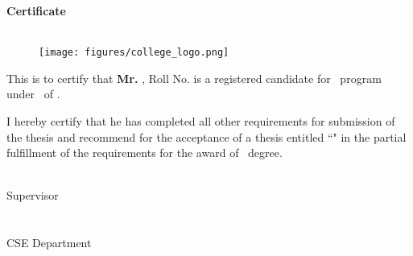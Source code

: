 \begin{center}
    \huge\textbf{Certificate}\\
    \MakeUppercase{\Large{\collegefullname}}\\
    \Large{\department}
\end{center}
\vspace{0.5cm}
\begin{figure}[H]
    \centering
    \texttt{[image: figures/college\_logo.png]}
\end{figure}
\vspace{0.5cm}

This is to certify that \textbf{Mr. \cMembOne}, Roll No. \textbf{\cMembOneRoll} is a registered candidate for \courseShort\ program under \department\ of \collegefullname.

I hereby certify that he has completed all other requirements for submission of the thesis and recommend for the acceptance of a thesis entitled ``\textbf{\projectname}" in the partial fulfillment of the requirements for the award of \courseShort\ degree. 


\vspace{2cm}

\begin{minipage}[t]{0.45\textwidth}
    \begin{flushleft}
        {\underline{\hspace{5cm}}}\\
        Supervisor\\
        \guidename\\
        \guideDesignation \\
        CSE Department\\
        \collegefullname\\
        
    \end{flushleft}
\end{minipage}

